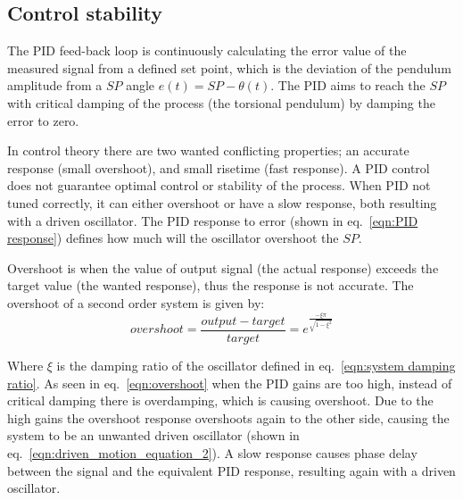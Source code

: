 \documentclass[\main/master.tex]{subfiles}
\begin{document}
\subsection{Control stability}
The PID feed-back loop is continuously calculating the error value of the measured signal from a defined set point, which is the deviation of the pendulum amplitude from a $SP$ angle $e(t) =SP -\theta(t) $. The PID aims to reach the $SP$ with critical damping of the process (the torsional pendulum) by damping the error to zero. 
\par\noindent
In control theory there are two wanted conflicting properties; an accurate response (small overshoot), and small risetime (fast response). A PID control does not guarantee optimal control or stability of the process. When PID not tuned correctly, it can either overshoot or have a slow response, both resulting with a driven oscillator. The PID response to error (shown in eq.~\ref{eqn:PID response}) defines how much will the oscillator overshoot the $SP$.
\par\noindent
Overshoot is when the value of output signal (the actual response) exceeds the target value (the wanted response), thus the response is not accurate. The overshoot of a second order system is given by:
\begin{equation}
overshoot =  \frac{output-target}{target} = e ^{\frac{-\xi\pi}{\sqrt{1-\xi^2}}}  \label{eqn:overshoot}
\end{equation}
\par\noindent
Where $\xi$ is the damping ratio of the oscillator defined in eq.~\ref{eqn:system damping ratio}. As seen in eq.~\ref{eqn:overshoot} when the PID gains are too high, instead of critical damping there is overdamping, which is causing overshoot. Due to the high gains the overshoot response overshoots again to the other side, causing the system to be an unwanted driven oscillator (shown in eq.~\ref{eqn:driven_motion_equation_2}). A slow response causes phase delay between the signal and the equivalent PID response, resulting again with a driven oscillator.
\end{document}
